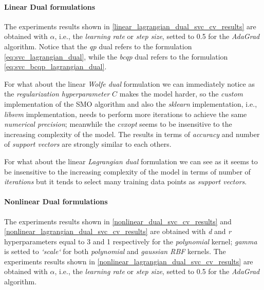 \pagebreak

\paragraph{Linear Dual formulations}

The experiments results shown in \ref{linear_lagrangian_dual_svc_cv_results} are obtained with $\alpha$, i.e., the \emph{learning rate} or \emph{step size}, setted to 0.5 for the \emph{AdaGrad} algorithm. Notice that the \emph{qp} dual refers to the formulation \eqref{eq:svc_lagrangian_dual}, while the \emph{bcqp} dual refers to the formulation \eqref{eq:svc_bcqp_lagrangian_dual}.



For what about the linear \emph{Wolfe dual} formulation we can immediately notice as the \emph{regularization hyperparameter} $C$ makes the model harder, so the \emph{custom} implementation of the SMO algorithm and also the \emph{sklearn} implementation, i.e., \emph{libsvm} \cite{chang2011libsvm} implementation, needs to perform more iterations to achieve the same \emph{numerical precision}; meanwhile the \emph{cvxopt} \cite{vandenberghe2010cvxopt} seems to be insensitive to the increasing complexity of the model. The results in terms of \emph{accuracy} and number of \emph{support vectors} are strongly similar to each others.



For what about the linear \emph{Lagrangian dual} formulation we can see as it seems to be insensitive to the increasing complexity of the model in terms of number of \emph{iterations} but it tends to select many training data points as \emph{support vectors}.

\pagebreak

\paragraph{Nonlinear Dual formulations}

The experiments results shown in \ref{nonlinear_dual_svc_cv_results} and \ref{nonlinear_lagrangian_dual_svc_cv_results} are obtained with \emph{d} and \emph{r} hyperparameters equal to 3 and 1 respectively for the \emph{polynomial} kernel; \emph{gamma} is setted to \emph{`scale`} for both \emph{polynomial} and \emph{gaussian RBF} kernels. The experiments results shown in \ref{nonlinear_lagrangian_dual_svc_cv_results} are obtained with $\alpha$, i.e., the \emph{learning rate} or \emph{step size}, setted to 0.5 for the \emph{AdaGrad} algorithm.

